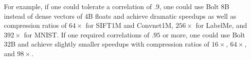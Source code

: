 For example, if one could tolerate a correlation of $.9$, one could use Bolt 8B instead of dense vectors of 4B floats and achieve dramatic speedups as well as compression ratios of $64\times$ for SIFT1M and Convnet1M, $256\times$ for LabelMe, and $392\times$ for MNIST. If one required correlations of $.95$ or more, one could use Bolt 32B and achieve slightly smaller speedups with compression ratios of $16\times$, $64\times$, and $98\times$.










